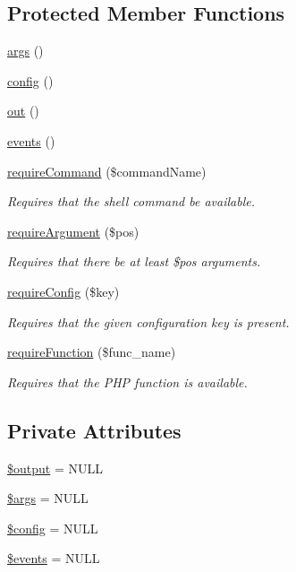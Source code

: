 \subsection*{Protected Member Functions}
\begin{DoxyCompactItemize}
\item 
\hyperlink{classGenericCommand_a2b5ffbef597bcac2bb27fb9fe9ceb996}{args} ()
\item 
\hyperlink{classGenericCommand_a806e73ae27fe8187419963c1839531b4}{config} ()
\item 
\hyperlink{classGenericCommand_a08478bb9a4cce51c5eec24b4dab17cc8}{out} ()
\item 
\hyperlink{classGenericCommand_ac45bd478789164f7c5fc219ead8cf9d2}{events} ()
\item 
\hyperlink{classGenericCommand_a7153033aa09664492cfb43ed990fd763}{require\-Command} (\$command\-Name)
\begin{DoxyCompactList}\small\item\em Requires that the shell command be available. \end{DoxyCompactList}\item 
\hyperlink{classGenericCommand_a5707289b6d0b2d8afd0bc63a82e99ad1}{require\-Argument} (\$pos)
\begin{DoxyCompactList}\small\item\em Requires that there be at least \$pos arguments. \end{DoxyCompactList}\item 
\hyperlink{classGenericCommand_a5161604bad2812fb55f62f5258dd4830}{require\-Config} (\$key)
\begin{DoxyCompactList}\small\item\em Requires that the given configuration key is present. \end{DoxyCompactList}\item 
\hyperlink{classGenericCommand_adc40591203a5344603b7365f12829cd8}{require\-Function} (\$func\-\_\-name)
\begin{DoxyCompactList}\small\item\em Requires that the P\-H\-P function is available. \end{DoxyCompactList}\end{DoxyCompactItemize}
\subsection*{Private Attributes}
\begin{DoxyCompactItemize}
\item 
\hyperlink{classGenericCommand_a8f106d346e007dea8c5bbc421c0a504a}{\$output} = N\-U\-L\-L
\item 
\hyperlink{classGenericCommand_aaba87ed8dbcb64903cc986bce80905d2}{\$args} = N\-U\-L\-L
\item 
\hyperlink{classGenericCommand_aa44f85a0df16aec7516d7e2dd97cb5e0}{\$config} = N\-U\-L\-L
\item 
\hyperlink{classGenericCommand_a88fc89058cfe1af1d211bf82c59deee0}{\$events} = N\-U\-L\-L
\end{DoxyCompactItemize}


